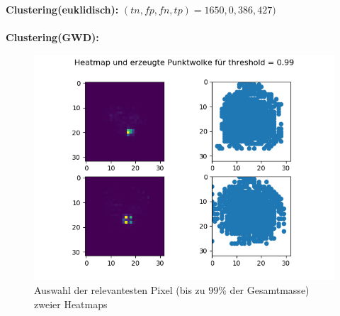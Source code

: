 \documentclass[11pt,a4paper]{article}
\numberwithin{equation}{section}
\begin{document}
	\noindent \textbf{Clustering(euklidisch):}
	$(tn, fp, fn, tp) = 1650, 0, 386, 427)$\\
	\\
	\noindent \textbf{Clustering(GWD):}
	\begin{figure}[h]
		\begin{center}
			\includegraphics[width=0.5\textheight]{HeatmapPunktwolke99.png}
			\caption{Auswahl der relevantesten Pixel (bis zu $99\%$ der Gesamtmasse) zweier Heatmaps}
		\end{center}
	\end{figure}
\end{document}
